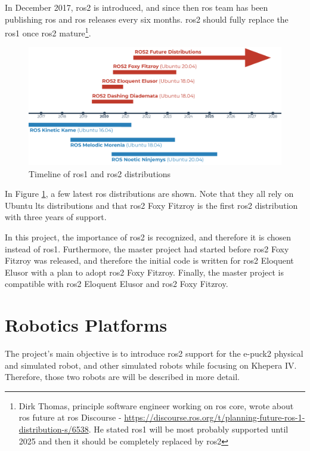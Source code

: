 In December 2017, \ac{ros2} is introduced, and since then \ac{ros} team has been publishing \ac{ros} and \ac{ros} releases every six months.
\ac{ros2} should fully replace the \ac{ros1} once \ac{ros2} mature\footnote{Dirk Thomas, principle software engineer working on \ac{ros} core, wrote about \ac{ros} future at \ac{ros} Discourse -  \url{https://discourse.ros.org/t/planning-future-ros-1-distribution-s/6538}. He stated \ac{ros1} will be most probably supported until 2025 and then it should be completely replaced by \ac{ros2}}.

\begin{figure}[H]
    \centering
    \includegraphics[width=\textwidth]{background/figures/ros_distributions}
    \caption{Timeline of \ac{ros1} and \ac{ros2} distributions}
    \label{fig:background:ros_distributions}
\end{figure}

In Figure \ref{fig:background:ros_distributions}, a few latest \ac{ros} distributions are shown.
Note that they all rely on Ubuntu \ac{lts} distributions and that \ac{ros2} Foxy Fitzroy is the first \ac{ros2} distribution with three years of support.

In this project, the importance of \ac{ros2} is recognized, and therefore it is chosen instead of \ac{ros1}.
Furthermore, the master project had started before \ac{ros2} Foxy Fitzroy was released, and therefore the initial code is written for \ac{ros2} Eloquent Elusor with a plan to adopt \ac{ros2} Foxy Fitzroy.
Finally, the master project is compatible with \ac{ros2} Eloquent Elusor and \ac{ros2} Foxy Fitzroy.

\section{Robotics Platforms}
The project's main objective is to introduce \ac{ros2} support for the e-puck2 physical and simulated robot, and other simulated robots while focusing on Khepera IV.
Therefore, those two robots are will be described in more detail.

